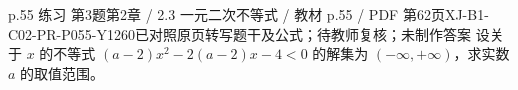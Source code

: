 \par\noindent\begin{minipage}{\linewidth}
\begin{bankitem}{p.55 练习 第3题}{第2章 / 2.3 一元二次不等式 / 教材 p.55 / PDF 第62页}{XJ-B1-C02-PR-P055-Y1260}{已对照原页转写题干及公式；待教师复核；未制作答案}
设关于 $x$ 的不等式 $(a-2)x^2-2(a-2)x-4<0$ 的解集为 $(-\infty,+\infty)$，求实数 $a$ 的取值范围。
\end{bankitem}
\end{minipage}\par\medskip
